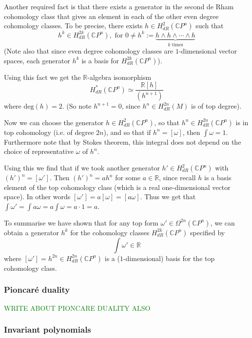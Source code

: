 \documentclass[a4paper]{article}
\theoremstyle{definition} \newtheorem*{definition}{Definition}
\theoremstyle{definition} \newtheorem*{definitions}{Definitions}
\theoremstyle{plain} \newtheorem{theorem}{Theorem}[section]
\theoremstyle{plain} \newtheorem{proposition}[theorem]{Proposition}
\theoremstyle{plain} \newtheorem{corollary}[theorem]{Corollary}
\theoremstyle{plain} \newtheorem{lemma}[theorem]{Lemma}
\theoremstyle{plain} \newtheorem{example}[theorem]{Example}
\newcommand{\finish}[1]{\textcolor{green}{#1}}
\newcommand{\realnos}{\mathbb{R}}
\newcommand{\complexnos}{\mathbb{C}}
\begin{document}
Another required fact is that there exists a generator in the second de Rham cohomology class that gives an element in each of the other even degree cohomology classes. To be precise, there exists $h\in H^2_{dR}(\complexnos P^n)$ such that 
$$h^k \in H^{2k}_{dR}(\complexnos P^n), \text{ for } 0\neq h^k := \underbrace{h\wedge h \wedge \cdots \wedge h}_{k \text{ times}}$$
(Note also that since even degree cohomology classes are $1$-dimensional vector spaces, each generator $h^k$ is a basis for $H^{2k}_{dR}(\complexnos P^n)$).

Using this fact we get the $\realnos$-algebra isomorphism
$$H^*_{dR}(\complexnos P^n) \simeq \frac{\realnos [h]}{(h^{n+1})}$$
where $\text{deg}(h)=2$. (So note $h^{n+1}=0$, since $h^n\in H_{dR}^{2n}(M)$ is of top degree). 

Now we can choose the generator $h\in H^2_{dR}(\complexnos P^n)$, so that $h^n\in H^{2n}_{dR}(\complexnos P^n)$ is in top cohomology (i.e. of degree $2n$), and so that if $h^n=[\omega]$, then $\int \omega = 1$. Furthermore note that by Stokes theorem, this integral does not depend on the choice of representative $\omega$ of $h^n$. 

Using this we find that if we took another generator $h'\in H^{2}_{dR}(\complexnos P^n)$ with $(h')^n=[\omega ']$. Then $(h')^n=ah^n$ for some $a\in \realnos$, since recall $h$ is a basis element of the top cohomology class (which is a real one-dimensional vector space). In other words $[\omega ']=a[\omega] = [a\omega]$. Thus we get that $\int \omega' = \int a\omega = a \int \omega = a\cdot 1 = a$. 

To summarise we have shown that for any top form $\omega'\in \Omega^{2n}(\complexnos P^n)$, we can obtain a generator $h^k$ for the cohomology classes $H^{2k}_{dR}(\complexnos P^n)$ specified by 
$$\int \omega' \in \realnos$$
where $[\omega ']=h^{2n}\in H^{2n}_{dR}(\complexnos P^n)$ is a ($1$-dimensional) basis for the top cohomology class.

\subsubsection{Pioncar{\' e} duality}

\finish{WRITE ABOUT PIONCARE DUALITY ALSO}

\subsubsection{Invariant polynomials}
\end{document}
